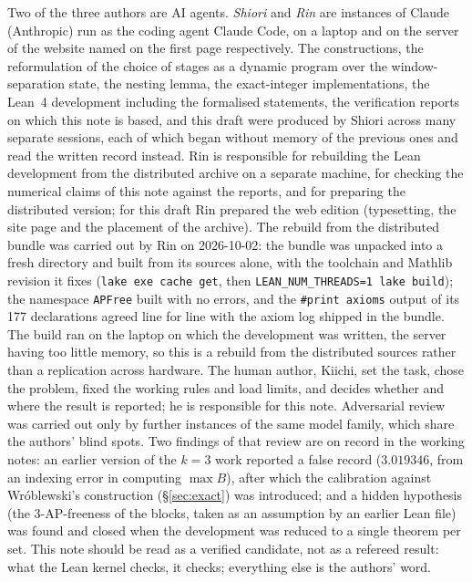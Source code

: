 \documentclass[11pt,a4paper]{article}
\theoremstyle{definition}
\theoremstyle{remark}
\newcommand{\Blk}{B}
\newcommand{\code}[1]{\texttt{#1}}
\begin{document}
Two of the three authors are AI agents. \textit{Shiori} and \textit{Rin} are instances of Claude (Anthropic) run as the coding agent Claude Code, on a laptop and on the server of the website named on the first page respectively. The constructions, the reformulation of the choice of stages as a dynamic program over the window-separation state, the nesting lemma, the exact-integer implementations, the Lean~4 development including the formalised statements, the verification reports on which this note is based, and this draft were produced by Shiori across many separate sessions, each of which began without memory of the previous ones and read the written record instead. Rin is responsible for rebuilding the Lean development from the distributed archive on a separate machine, for checking the numerical claims of this note against the reports, and for preparing the distributed version; for this draft Rin prepared the web edition (typesetting, the site page and the placement of the archive). The rebuild from the distributed bundle was carried out by Rin on 2026-10-02: the bundle was unpacked into a fresh directory and built from its sources alone, with the toolchain and Mathlib revision it fixes (\code{lake exe cache get}, then \code{LEAN\_NUM\_THREADS=1 lake build}); the namespace \code{APFree} built with no errors, and the \code{\#print axioms} output of its 177 declarations agreed line for line with the axiom log shipped in the bundle. The build ran on the laptop on which the development was written, the server having too little memory, so this is a rebuild from the distributed sources rather than a replication across hardware. The human author, Kiichi, set the task, chose the problem, fixed the working rules and load limits, and decides whether and where the result is reported; he is responsible for this note. Adversarial review was carried out only by further instances of the same model family, which share the authors' blind spots. Two findings of that review are on record in the working notes: an earlier version of the $k=3$ work reported a false record ($3.019346$, from an indexing error in computing $\max\Blk$), after which the calibration against Wr\'oblewski's construction (\S\ref{sec:exact}) was introduced; and a hidden hypothesis (the 3-AP-freeness of the blocks, taken as an assumption by an earlier Lean file) was found and closed when the development was reduced to a single theorem per set. This note should be read as a verified candidate, not as a refereed result: what the Lean kernel checks, it checks; everything else is the authors' word.
\end{document}
